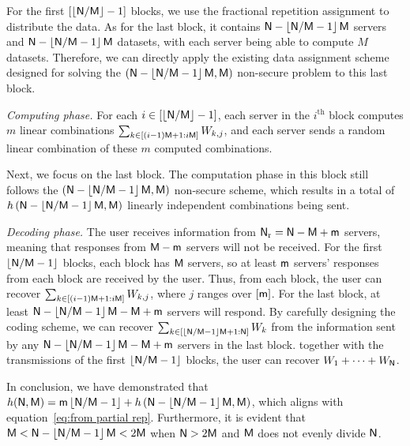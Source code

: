 \documentclass[conference,letterpaper]{IEEEtran}
\begin{document}
For the first $\left[\left\lfloor {\sf N}/{\sf M} \right\rfloor - 1\right]$ blocks, we use the fractional repetition assignment to distribute the data. As for the last block, it contains ${\sf N} - \left\lfloor {\sf N}/{\sf M} - 1 \right\rfloor {\sf M}$ servers and ${\sf N} - \left\lfloor {\sf N}/{\sf M} - 1 \right\rfloor {\sf M}$ datasets, with each server being able to compute $M$ datasets. Therefore, we can directly apply the existing data assignment scheme designed for solving the $({\sf N} - \left\lfloor {\sf N}/{\sf M} - 1 \right\rfloor {\sf M}, {\sf M})$ non-secure problem to this last block.

{\it Computing phase.}
For each $i \in \left[\left\lfloor {\sf N}/{\sf M} \right\rfloor - 1\right]$, each server in the $i^{\text{th}}$ block computes $m$ linear combinations $\sum_{k\in \left[(i-1){\sf M} + 1 : i{\sf M}\right]} W_{k,j}$,  and each server sends a random linear combination of these $m$ computed combinations.

Next, we focus on the last block. The computation phase in this block still follows the $({\sf N} - \left\lfloor {\sf N}/{\sf M} - 1 \right\rfloor {\sf M}, {\sf M})$ non-secure scheme, which results in a total of $h\left({\sf N} - \left\lfloor {\sf N}/{\sf M} - 1 \right\rfloor {\sf M}, {\sf M}\right)$ linearly independent combinations being sent.



{\it Decoding phase.}
The user receives information from ${\sf N}_{\rm r} = {\sf N} - {\sf M} + {\sf m}$ servers, meaning that responses from ${\sf M} - {\sf m}$ servers will not be received. For the first $\left\lfloor {\sf N}/{\sf M} - 1 \right\rfloor$ blocks, each block has ${\sf M}$ servers, so at least ${\sf m}$ servers' responses from each block are received by the user. Thus, from each block, the user can recover $\sum_{k \in \left[(i-1){\sf M} + 1 : i{\sf M}\right]} W_{k,j}$, where $j$ ranges over $[{\sf m}]$. 
For the last block, at least ${\sf N} - \left\lfloor {\sf N}/{\sf M} - 1 \right\rfloor {\sf M} - {\sf M} + {\sf m}$ servers will respond. By carefully designing the coding scheme, we can recover $\sum_{k \in \left[\left\lfloor {\sf N}/{\sf M} - 1 \right\rfloor {\sf M} + 1 : {\sf N}\right]} W_k$ from the information sent by any ${\sf N} - \left\lfloor {\sf N}/{\sf M} - 1 \right\rfloor {\sf M} - {\sf M} + {\sf m}$ servers in the last block.
together with the transmissions of the first $\left\lfloor  {\sf N}/{\sf M} -1 \right\rfloor$ blocks, the user can recover $W_1 + \cdots +W_{{\sf N}}$.

In conclusion, we have demonstrated that $h({\sf N}, {\sf M}) = {\sf m}\left\lfloor {\sf N}/{\sf M} - 1 \right\rfloor + h\left({\sf N} - \left\lfloor {\sf N}/{\sf M} - 1 \right\rfloor {\sf M}, {\sf M} \right)$, which aligns with equation~\eqref{eq:from partial rep}. 
Furthermore, it is evident that ${\sf M} < {\sf N} - \left\lfloor {\sf N}/{\sf M} - 1 \right\rfloor {\sf M} < 2{\sf M}$ when ${\sf N} > 2{\sf M}$ and ${\sf M}$ does not evenly divide ${\sf N}$.
\end{document}
